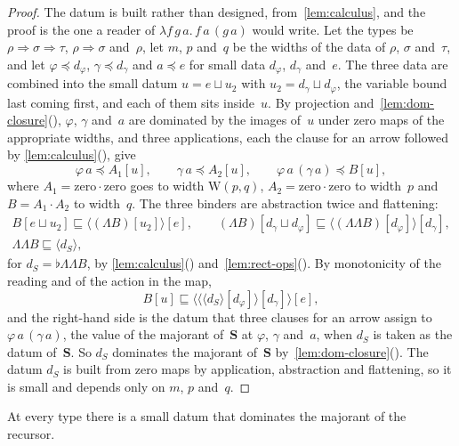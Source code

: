 \documentclass[11pt]{amsart}
\makeatletter
\newcommand{\arr}{\Rightarrow}
\newcommand{\Sc}{\mathbf{S}}
\newcommand{\W}{\mathrm{W}}
\newcommand{\tle}{\mathrel{\sqsubseteq}}      %
\newcommand{\dom}{\mathrel{\preccurlyeq}}     %
\newcommand{\act}[2]{#1[#2]}                  %
\newcommand{\rd}[1]{\langle #1 \rangle}       %
\newif\ifagdarefs
\newcommand{\AgdaRefs}[1]{\ifagdarefs{\footnotesize\color{agdablue}(#1)}\else\unskip\fi}
\newcommand{\Agda}[2]{{\footnotesize\color{agdablue}\textsf{#1}%
  \ifblank{#2}{}{\texttt{.}\allowbreak\texttt{#2}}}}
\let\ttt@plain\texttt
\renewcommand{\texttt}[1]{{\footnotesize\color{agdablue}\ttt@plain{#1}}}
\theoremstyle{plain}
\theoremstyle{definition}
\makeatother
\begin{document}
\begin{proof}
The datum is built rather than designed, from~\cref{lem:calculus},
and the proof is the one a reader of $\lambda f\,g\,a.\,f\,a\,(g\,a)$
would write. Let the types be $\rho\arr\sigma\arr\tau$,
$\rho\arr\sigma$ and~$\rho$, let $m$, $p$ and~$q$ be the widths of
the data of $\rho$, $\sigma$ and~$\tau$, and let
$\varphi \dom d_\varphi$, $\gamma \dom d_\gamma$ and $a \dom e$ for small data
$d_\varphi$, $d_\gamma$ and~$e$. The three data are combined into the
small datum $u = e \sqcup u_2$ with $u_2 = d_\gamma \sqcup d_\varphi$,
the variable bound last coming first, and each of them sits
inside~$u$. By projection
and~\cref{lem:dom-closure}(), $\varphi$, $\gamma$ and~$a$ are dominated by the
images of~$u$ under zero maps of the appropriate widths, and three
applications, each the clause for an arrow followed by
\cref{lem:calculus}(), give
\[
  \varphi\,a \dom \act{A_1}{u} , \qquad
  \gamma\,a \dom \act{A_2}{u} , \qquad
  \varphi\,a\,(\gamma\,a) \dom \act{B}{u} ,
\]
where $A_1 = \mathrm{zero}\cdot\mathrm{zero}$ goes to width
$\W(p,q)$, $A_2 = \mathrm{zero}\cdot\mathrm{zero}$ to width~$p$ and
$B = A_1 \cdot A_2$ to width~$q$. The three binders are abstraction
twice and flattening:
\begin{gather*}
  \act{B}{e \sqcup u_2} \tle \act{\rd{\act{(\Lambda B)}{u_2}}}{e} ,
  \qquad
  \act{(\Lambda B)}{d_\gamma \sqcup d_\varphi}
    \tle \act{\rd{\act{(\Lambda\Lambda B)}{d_\varphi}}}{d_\gamma} ,
  \\
  \Lambda\Lambda B \tle \rd{d_S} ,
\end{gather*}
for $d_S = \flat\Lambda\Lambda B$, by
\cref{lem:calculus}()
and~\cref{lem:rect-ops}(). By monotonicity of
the reading and of the action in the map,
\[
  \act{B}{u} \tle
  \act{\rd{\act{\rd{\act{\rd{d_S}}{d_\varphi}}}{d_\gamma}}}{e} ,
\]
and the right-hand side is the datum that three clauses for an arrow
assign to $\varphi\,a\,(\gamma\,a)$, the value of the majorant of~$\Sc$
at $\varphi$, $\gamma$ and~$a$, when $d_S$ is taken as the datum
of~$\Sc$. So $d_S$ dominates the majorant of~$\Sc$
by~\cref{lem:dom-closure}(). The datum $d_S$ is built from zero maps
by application, abstraction and flattening, so it is small and depends
only on $m$, $p$ and~$q$.
\end{proof}

\begin{lemma}
\label{lem:iter-clause}
At every type there is a small datum that dominates the majorant of
the recursor.
\AgdaRefs{\Agda{DialogueTrees.IterClause}{dI}; \texttt{dI-All<},
\texttt{Iter-clause}.}
\end{lemma}
\end{document}

